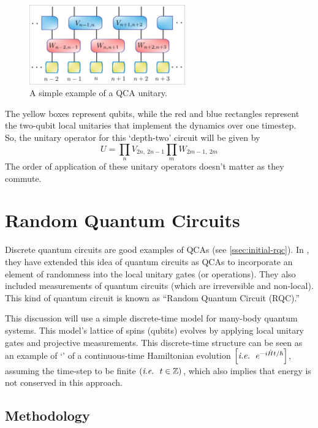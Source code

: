 \documentclass[11pt, oneside, listof=totoc]{scrbook}
\begin{document}
\begin{figure}[H]
    \centering
    \includegraphics[width = 0.6\textwidth]{qca-example.png}
    \caption{A simple example of a QCA unitary.}
    \label{fig:qca-example}
\end{figure} \noindent
The yellow boxes represent qubits, while the red and blue rectangles represent the two-qubit local unitaries that implement the dynamics over one timestep.\\
So, the unitary operator for this `depth-two' circuit will be given by
\begin{equation*}
    U = \prod_{n} V_{2n, ~ 2n-1} \prod_{m} W_{2m-1, ~2m}
\end{equation*}
The order of application of these unitary operators doesn't matter as they commute.


\chapter{Random Quantum Circuits}

Discrete quantum circuits are good examples of QCAs (see \cref{ssec:initial-rqc}). In \cite{Fisher2023}, they have extended this idea of quantum circuits as QCAs to incorporate an element of randomness into the local unitary gates (or operations). They also included measurements of quantum circuits (which are irreversible and non-local). This kind of quantum circuit is known as ``Random Quantum Circuit (RQC).''

This discussion will use a simple discrete-time model for many-body quantum systems. This model's lattice of spins (qubits) evolves by applying local unitary gates and projective measurements. This discrete-time structure can be seen as an example of `' of a continuous-time Hamiltonian evolution \(\qty[\textit{i.e.~} ~ e^{-i\hat{H} t / \hslash}]\), assuming the time-step to be finite \(\qty(\textit{i.e.~} ~ t \in \mathbb Z)\), which also implies that energy is not conserved in this approach.

\section{Methodology}
\end{document}
